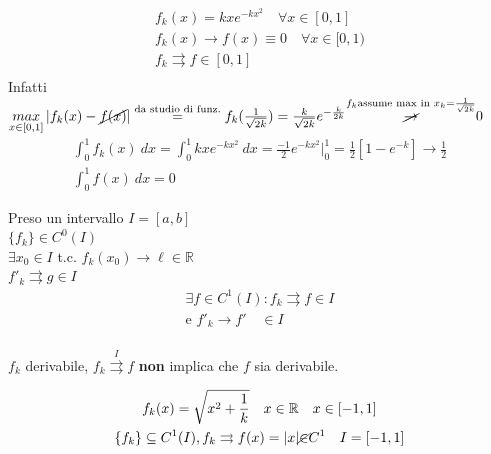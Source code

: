 \documentclass[a4paper, oneside]{article}
\begin{document}
\begin{example}
  \begin{gather*}
    f_k(x) = k x e^{-kx^2} \quad \forall x \in [0,1]\\
    f_k(x) \to f(x) \equiv 0 \quad \forall x \in [0, 1)\\
    f_k \rightrightarrows f \in [0,1]\\
  \end{gather*}
  Infatti $\underset{x \in [0,1]}{max} \left\lvert f_k(x) - \cancel{f(x)} \right\rvert  \overset{\text{da studio di funz.}}{ = } f_k (\frac{1}{\sqrt{2k}}) = \frac{k}{\sqrt{2k}} e^{-\frac{k}{2k}} \overset{f_k \text{assume max in } x_k = \frac{1}{\sqrt{2k}}}{\cancel{\to}} 0$
  \begin{gather*}
    \int_0^1 f_k(x) \ dx = \int_0^1 kx e^{-kx^2} \ dx = \frac{-1}{2} e^{-kx^2} \Big|_0^1 = \frac{1}{2} [1 - e^{-k}] \to \frac{1}{2}\\
    \int_0^1 f(x) \ dx = 0
  \end{gather*}
\end{example}

\begin{theorem}
  Preso un intervallo $I = [a,b]$\\
   $\{f_k\} \in C^0 (I)$\\
   $\exists x_0 \in I $ t.c. $ f_k(x_0) \to \ell \in \mathbb{R}$\\
   $f'_k \rightrightarrows g \in I$\\
  \begin{gather*}
    \exists f \in C^1 (I) : f_k \rightrightarrows f \in I\\
    \text{e } f'_k \to f' \quad \in I\\
  \end{gather*}
\end{theorem}

\begin{observation}
  $f_k$ derivabile, $f_k \overset{I}{\rightrightarrows} f$ \textbf{non} implica che $f$ sia derivabile.\\
\end{observation}

\begin{example}
  \begin{gather*}
    f_k (x) = \sqrt{x^2 + \frac{1}{k}} \quad x \in \mathbb{R} \quad x \in [-1,1]\\
    \{ f_k \} \subseteq C^1(I) , f_k \rightrightarrows f(x) = |x| \cancel{\in} C^1 \quad I = [-1,1]\\
  \end{gather*}
\end{example}
\end{document}
